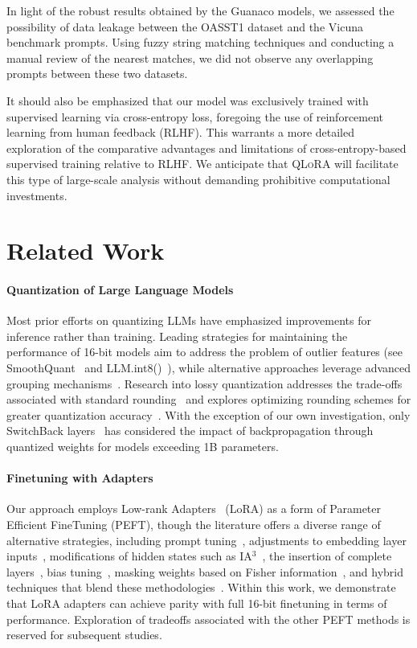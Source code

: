 In light of the robust results obtained by the {Guanaco} models, we assessed the possibility of data leakage between the OASST1 dataset and the Vicuna benchmark prompts. Using fuzzy string matching techniques and conducting a manual review of the nearest matches, we did not observe any overlapping prompts between these two datasets.

It should also be emphasized that our model was exclusively trained with supervised learning via cross-entropy loss, foregoing the use of reinforcement learning from human feedback (RLHF). This warrants a more detailed exploration of the comparative advantages and limitations of cross-entropy-based supervised training relative to RLHF. We anticipate that \textsc{QLoRA} will facilitate this type of large-scale analysis without demanding prohibitive computational investments.

\section{Related Work}

\paragraph{Quantization of Large Language Models} Most prior efforts on quantizing LLMs have emphasized improvements for inference rather than training. Leading strategies for maintaining the performance of 16-bit models aim to address the problem of outlier features (see SmoothQuant~\citep{xiao2022smoothquant} and LLM.int8()~\citep{dettmers2022llm}), while alternative approaches leverage advanced grouping mechanisms~\citep{park2022nuqmm, yao2022zeroquant}. Research into lossy quantization addresses the trade-offs associated with standard rounding~\citep{dettmers2022case,zeng2022glm,pope2022efficiently} and explores optimizing rounding schemes for greater quantization accuracy~\citep{frantar2022gptq}. With the exception of our own investigation, only SwitchBack layers~\citep{wortsman2023stable} has considered the impact of backpropagation through quantized weights for models exceeding 1B parameters.

\paragraph{Finetuning with Adapters} Our approach employs Low-rank Adapters~\citep{hu2021lora} (LoRA) as a form of Parameter Efficient FineTuning (PEFT), though the literature offers a diverse range of alternative strategies, including prompt tuning~\citep{qin2021learning,lester2021power,li2021prefix}, adjustments to embedding layer inputs~\citep{an2022input}, modifications of hidden states such as IA$^3$~\citep{liu2022few}, the insertion of complete layers~\citep{houlsby2019parameter}, bias tuning~\citep{zaken2021bitfit}, masking weights based on Fisher information~\citep{sung2021training}, and hybrid techniques that blend these methodologies~\citep{henderson2021compacter}. Within this work, we demonstrate that LoRA adapters can achieve parity with full 16-bit finetuning in terms of performance. Exploration of tradeoffs associated with the other PEFT methods is reserved for subsequent studies.

